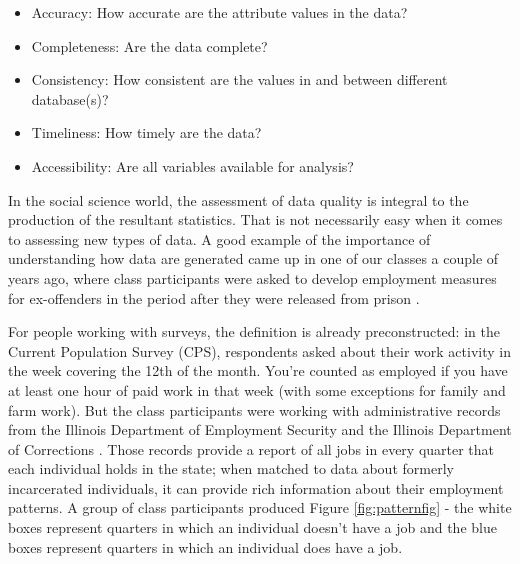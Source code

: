 \documentclass[]{krantz}
\providecommand{\tightlist}{%
  \setlength{\itemsep}{0pt}\setlength{\parskip}{0pt}}
\begin{document}
\begin{itemize}
\tightlist
\item
  Accuracy: How accurate are the attribute values in the data?
\item
  Completeness: Are the data complete?
\item
  Consistency: How consistent are the values in and between different
  database(s)?
\item
  Timeliness: How timely are the data?
\item
  Accessibility: Are all variables available for analysis?
\end{itemize}

In the social science world, the assessment of data quality is integral
to the production of the resultant statistics. That is not necessarily
easy when it comes to assessing new types of data. A good example of the
importance of understanding how data are generated came up in one of our
classes a couple of years ago, where class participants were asked to
develop employment measures for ex-offenders in the period after they
were released from prison \citep{Kreuter2019Change}.

For people working with surveys, the definition is already
preconstructed: in the Current Population Survey (CPS), respondents
asked about their work activity in the week covering the 12th of the
month. You're counted as employed if you have at least one hour of paid
work in that week (with some exceptions for family and farm work). But
the class participants were working with administrative records from the
Illinois Department of Employment Security and the Illinois Department
of Corrections \citep{Kreuter2019Change}. Those records provide a report
of all jobs in every quarter that each individual holds in the state;
when matched to data about formerly incarcerated individuals, it can
provide rich information about their employment patterns. A group of
class participants produced Figure \ref{fig:patternfig} - the white
boxes represent quarters in which an individual doesn't have a job and
the blue boxes represent quarters in which an individual does have a
job.
\end{document}
